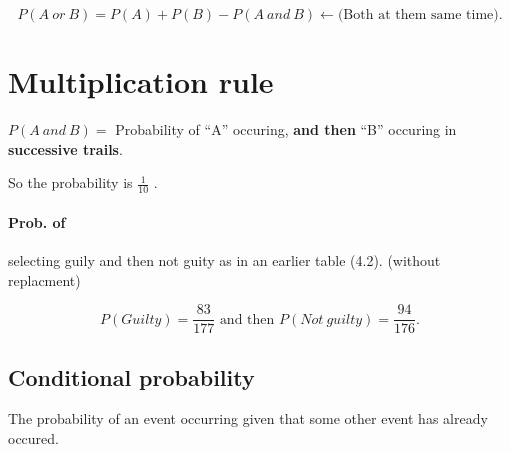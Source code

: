 
\[ P(A \ or \ B) = P(A) + P(B) - P(A \ and \ B) \leftarrow( \text{Both at them same time)} .\] 

\section{Multiplication rule}
$P(A \ and \ B) =$ Probability of ``A'' occuring, \textbf{and then} ``B'' occuring in \textbf{successive trails}.


\begin{figure}[ht]
    \centering
    \label{fig:lec_02_1}
\end{figure}

So the probability is $\frac{1}{10}$ .


\paragraph{Prob. of} selecting guily and then not guity as in an earlier table (4.2).
(without replacment)

\[ P(Guilty)=\frac{83}{177} \text{ and then } P(Not \ guilty)=\frac{94}{176} .\] 

\subsection{Conditional probability}
The probability of an event occurring given that some other event has already occured.

